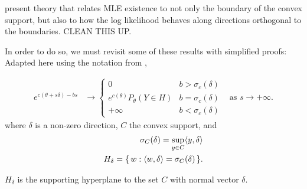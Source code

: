 \citet{Geyer:1990,Geyer:gdor} present theory that relates MLE existence to not only
the boundary of the convex support, but also to how the log likelihood behaves along
directions orthogonal to the boundaries.
CLEAN THIS UP.

In order to do so, we must revisit some of these results with simplified proofs:
Adapted here using the notation from \citep{Geyer:gdor},
\begin{theorem}
\begin{align*}
e^{c(\theta + s \delta) - bs} &\to 
		\begin{cases} 
			0 								& b > \sigma_c(\delta) \\
			e^{c(\theta)} P_\theta(Y \in H ) 	& b = \sigma_c(\delta) \\
			+\infty							& b < \sigma_c(\delta)
		\end{cases}
& \text{as } s \to +\infty.
\end{align*}
where $\delta$ is a non-zero direction, $C$ the convex support, and
\begin{align*}
	\sigma_C (\delta) = \sup_{y \in C} \langle  y, \delta \rangle \\
	H_\delta = \{\, w: \langle w, \delta \rangle = \sigma_C(\delta)  \,\}.
\end{align*}
\end{theorem}
$H_\delta$ is the supporting hyperplane to the set $C$ with normal vector $\delta$.

